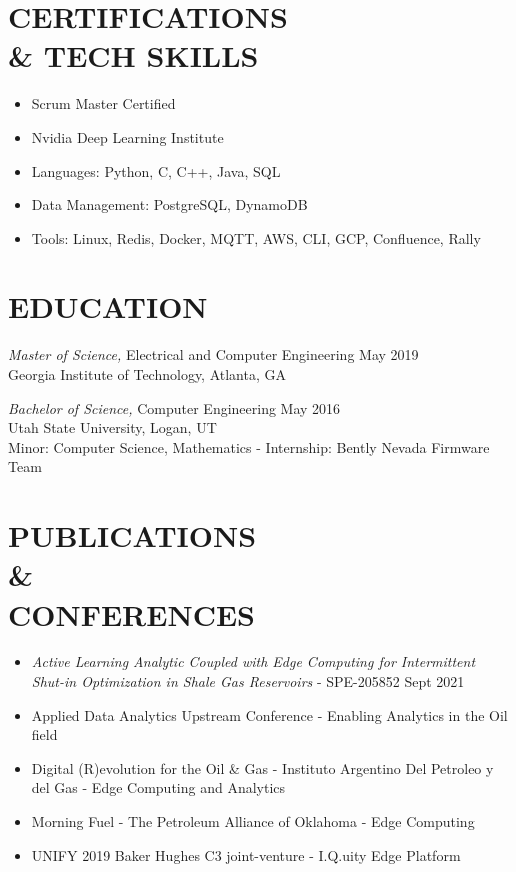 \documentclass[line,margin]{res}
\begin{document}
\begin{resume}
	\section{CERTIFICATIONS\\\& TECH SKILLS}
	\begin{itemize} \itemsep -2pt
		\item Scrum Master Certified
		\item Nvidia Deep Learning Institute
		\item Languages: Python, C, C++, Java, SQL
		\item Data Management: PostgreSQL, DynamoDB
		\item Tools: Linux, Redis, Docker, MQTT, AWS, CLI, GCP, Confluence, Rally
	\end{itemize}

	\section{EDUCATION}
	 {\sl Master of Science,} Electrical and Computer Engineering \hfill May 2019\\
	Georgia Institute of Technology, Atlanta, GA

		{\sl Bachelor of Science,} Computer Engineering \hfill May 2016\\
	Utah State University, Logan, UT\\
	Minor: Computer Science, Mathematics - Internship: Bently Nevada Firmware Team
	\section{PUBLICATIONS\\\&\\CONFERENCES}
	\begin{itemize} \itemsep -2pt
		\item {\sl Active Learning Analytic Coupled with Edge Computing for Intermittent Shut-in Optimization in Shale Gas Reservoirs} - SPE-205852 Sept 2021
		\item Applied Data Analytics Upstream Conference - Enabling Analytics in the Oil field
		\item Digital (R)evolution for the Oil \& Gas - Instituto Argentino Del Petroleo y del Gas - Edge Computing and Analytics
		\item Morning Fuel - The Petroleum Alliance of Oklahoma - Edge Computing
		\item UNIFY 2019 Baker Hughes C3 joint-venture - I.Q.uity Edge Platform
	\end{itemize}



\end{resume}
\end{document}
